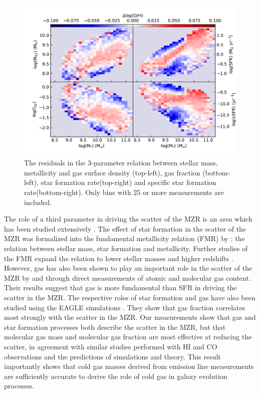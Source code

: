 \documentclass[fleqn,usenatbib]{mnras}
\begin{document}
\begin{figure}
    \centering
    \includegraphics[width=2\columnwidth]{figures/fig12.pdf}
    \caption{The residuals in the 3-parameter relation between stellar mass, metallicity and gas surface density (top-left), gas fraction (bottom-left), star formation rate(top-right) and specific star formation rate(bottom-right). Only bins with 25 or more measurements are included.}
    \label{fig:MZR_binned_metallicity_residuals}
\end{figure}

The role of a third parameter in driving the scatter of the MZR is an area which has been studied extensively \citep[e.g.][]{ellison2008}. The effect of star formation in the scatter of the MZR was formalized into the fundamental metallicity relation (FMR) by \cite{mannucci2010}: the relation between stellar mass, star formation and metallicity. Further studies of the FMR expand the relation to lower stellar masses and higher redshifts \citep{mannucci2011, cresci2019, curti2020}. However, gas has also been shown to play an important role in the scatter of the MZR by \cite{brinchmann2013, bothwell2013, bothwell2016, lara-lopez2013, hughes2013} and \cite{brown2018} through direct measurements of atomic and molecular gas content. Their results suggest that gas is more fundamental than SFR in  driving the scatter in the MZR. The respective roles of star formation and gas have also been studied using the EAGLE simulations \citep{loon2021}. They show that gas fraction correlates most strongly with the scatter in the MZR. Our measurements show that gas and star formation processes both describe the scatter in the MZR, but that molecular gas mass and molecular gas fraction are most effective at reducing the scatter, in agreement with similar studies performed with HI and CO observations and the predictions of simulations and theory. 
This result importantly shows that cold gas masses derived from emission line measurements are sufficiently accurate to derive the role of cold gas in galaxy evolution processes. 
\end{document}
